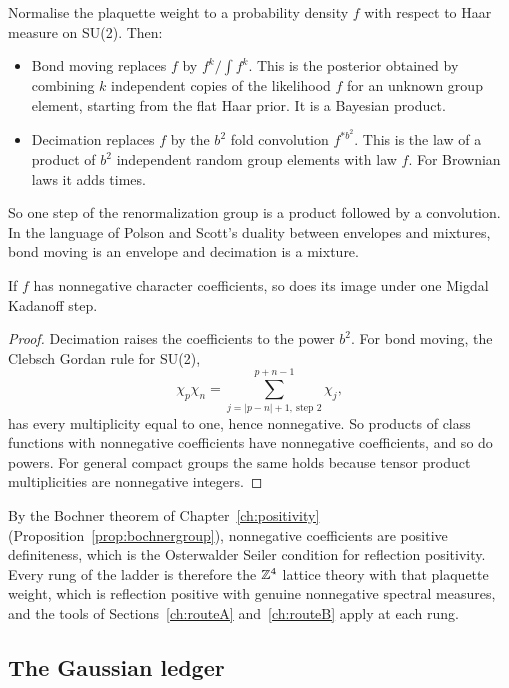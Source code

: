 Normalise the plaquette weight to a probability density $f$ with respect to Haar measure on SU(2). Then:
\begin{itemize}
\item Bond moving replaces $f$ by $f^k/\int f^k$. This is the posterior obtained by combining $k$ independent copies of the likelihood $f$ for an unknown group element, starting from the flat Haar prior. It is a Bayesian product.
\item Decimation replaces $f$ by the $b^2$ fold convolution $f^{*b^2}$. This is the law of a product of $b^2$ independent random group elements with law $f$. For Brownian laws it adds times.
\end{itemize}
So one step of the renormalization group is a product followed by a convolution. In the language of Polson and Scott's\cite{PSdual} duality between envelopes and mixtures, bond moving is an envelope and decimation is a mixture.

\begin{lemma}\label{lem:posB}
If $f$ has nonnegative character coefficients, so does its image under one Migdal Kadanoff step.
\end{lemma}

\begin{proof}
Decimation raises the coefficients to the power $b^2$. For bond moving, the Clebsch Gordan rule for SU(2),
\[
\chi_p\chi_n=\sum_{j=|p-n|+1,\ \text{step }2}^{p+n-1}\chi_j,
\]
has every multiplicity equal to one, hence nonnegative. So products of class functions with nonnegative coefficients have nonnegative coefficients, and so do powers. For general compact groups the same holds because tensor product multiplicities are nonnegative integers.
\end{proof}

By the Bochner theorem of Chapter~\ref{ch:positivity} (Proposition~\ref{prop:bochnergroup}), nonnegative coefficients are positive definiteness, which is the Osterwalder Seiler condition for reflection positivity. Every rung of the ladder is therefore the $\mathbb{Z}^4$ lattice theory with that plaquette weight, which is reflection positive with genuine nonnegative spectral measures, and the tools of Sections~\ref{ch:routeA} and~\ref{ch:routeB} apply at each rung.

\subsection{The Gaussian ledger}

